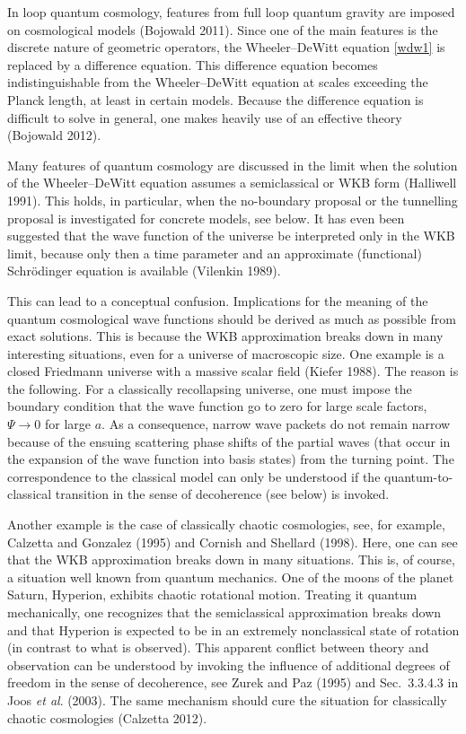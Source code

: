 \documentclass[12pt,a4paper]{article}
\begin{document}
In loop quantum cosmology, features from full loop quantum gravity are
imposed on cosmological models (Bojowald 2011).
Since one of the main features is the discrete nature of geometric
operators, the Wheeler--DeWitt equation \eqref{wdw1} is replaced by a
difference equation. This difference equation becomes
indistinguishable from the Wheeler--DeWitt equation at scales
exceeding the Planck length, at least in certain models. Because the
difference equation is difficult to solve in general, one makes
heavily use of an effective theory (Bojowald 2012).

Many features of quantum cosmology are discussed in the limit when
the solution of the Wheeler--DeWitt equation assumes a semiclassical
or WKB form (Halliwell 1991). This holds, in particular, when the
no-boundary proposal or the tunnelling proposal is investigated for
concrete models, see below. It has even been suggested that the wave function of
the universe be interpreted only in the WKB limit, because only then a
time parameter and an approximate (functional) Schr\"odinger equation
is available (Vilenkin 1989). 

This can lead to a conceptual confusion. Implications for the meaning of
the quantum cosmological wave functions should be derived as much as
possible from exact solutions. This is because the WKB approximation
breaks down in many interesting situations, even for a universe of
macroscopic size. One example is a closed Friedmann universe with a massive
scalar field (Kiefer 1988). The reason is the following. For a
classically recollapsing universe, one must impose the boundary
condition that the wave function go to zero for large scale factors,
$\Psi\to0$ for large $a$. As a consequence, narrow wave packets do not
remain narrow because of the ensuing scattering phase shifts of the
partial waves (that occur in the expansion of the wave function 
into basis states) from the turning point. The correspondence to the
classical model can only be understood if the quantum-to-classical
transition in the sense of decoherence (see below) is invoked.  

Another example is the case of classically chaotic cosmologies, see,
for example, Calzetta and Gonzalez (1995) and Cornish and Shellard
(1998). Here, one can see that the WKB approximation breaks down in
many situations. This is, of course, a situation well known from
quantum mechanics. One of the moons of the planet Saturn, Hyperion,
exhibits chaotic rotational motion. Treating it quantum mechanically,
one recognizes that the semiclassical approximation breaks down and
that Hyperion is expected to be in an extremely nonclassical state of
rotation (in contrast to what is observed). This apparent conflict
between theory and observation can be understood by invoking the
influence of additional degrees of freedom in the sense of
decoherence, see Zurek and Paz (1995) and Sec.~3.3.4.3 in Joos {\em et
  al}. (2003). The same mechanism should cure the situation
for classically chaotic cosmologies (Calzetta 2012). 
\end{document}
